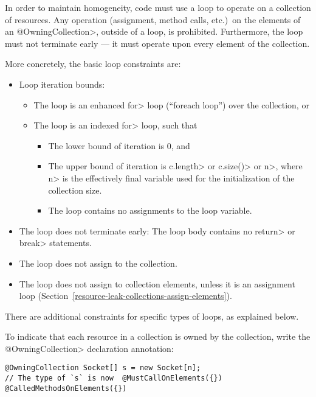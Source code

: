 
In order to maintain homogeneity, code must use a loop to operate on a
collection of resources.  Any operation (assignment, method calls, etc.)\
on the elements of an \<@OwningCollection>, outside of a loop, is
prohibited.  Furthermore, the loop must not terminate early --- it must
operate upon every element of the collection.

More concretely, the basic loop constraints are:
\begin{itemize}
\item Loop iteration bounds:
  \begin{itemize}
  \item
    The loop is an enhanced \<for> loop (``foreach loop'') over the collection, or
  \item
    The loop is an indexed \<for> loop, such that
    \begin{itemize}
    \item The lower bound of iteration is 0, and
    \item The upper bound of iteration is \<c.length> or \<c.size()> or \<n>,
      where \<n> is the effectively final variable used for the initialization of
      the collection size.
    \item The loop contains no assignments to the loop variable.
    \end{itemize}
  \end{itemize}
\item The loop does not terminate early: The loop body contains no \<return> or \<break> statements.
\item The loop does not assign to the collection.
\item The loop does not assign to collection elements, unless it is an
  assignment loop (Section~\ref{resource-leak-collections-assign-elements}).
\end{itemize}

\noindent There are additional constraints for specific types of loops, as
explained below.



To indicate that each resource in a collection is owned by the collection, write the \<@OwningCollection> declaration annotation:

\begin{Verbatim}
@OwningCollection Socket[] s = new Socket[n];
// The type of `s` is now  @MustCallOnElements({}) @CalledMethodsOnElements({})
\end{Verbatim}

